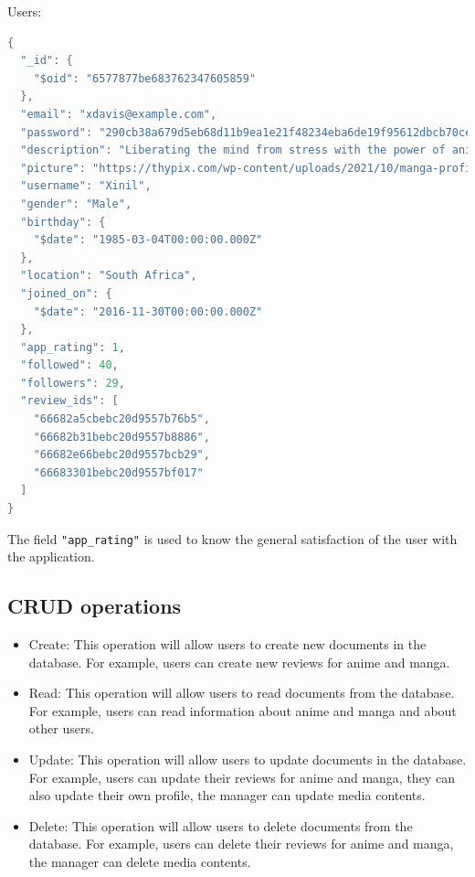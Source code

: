 Users:
\begin{mdframed}[backgroundcolor=yellow!20, innerleftmargin=10pt, innerrightmargin=10pt]
    \begin{lstlisting}[language=java]
      {
  "_id": {
    "$oid": "6577877be683762347605859"
  },
  "email": "xdavis@example.com",
  "password": "290cb38a679d5eb68d11b9ea1e21f48234eba6de19f95612dbcb70ce0c7e4e78",
  "description": "Liberating the mind from stress with the power of anime zen.",
  "picture": "https://thypix.com/wp-content/uploads/2021/10/manga-profile-picture-44.jpg",
  "username": "Xinil",
  "gender": "Male",
  "birthday": {
    "$date": "1985-03-04T00:00:00.000Z"
  },
  "location": "South Africa",
  "joined_on": {
    "$date": "2016-11-30T00:00:00.000Z"
  },
  "app_rating": 1,
  "followed": 40,
  "followers": 29,
  "review_ids": [
    "66682a5cbebc20d9557b76b5",
    "66682b31bebc20d9557b8886",
    "66682e66bebc20d9557bcb29",
    "66683301bebc20d9557bf017"
  ]
}
    \end{lstlisting}
\end{mdframed}


The field \texttt{"app\_rating"} is used to know the general satisfaction of the user with the application.

\newpage

\subsection {CRUD operations}
\begin{itemize}
    \item Create: This operation will allow users to create new documents in the database. For example, users can create new reviews for anime and manga.
    \item Read: This operation will allow users to read documents from the database. For example, users can read information about anime and manga and about other users.
    \item Update: This operation will allow users to update documents in the database. For example, users can update their reviews for anime and manga, they can also update their own profile, the manager can update media contents.
    \item Delete: This operation will allow users to delete documents from the database. For example, users can delete their reviews for anime and manga, the manager can delete media contents.
\end{itemize}

